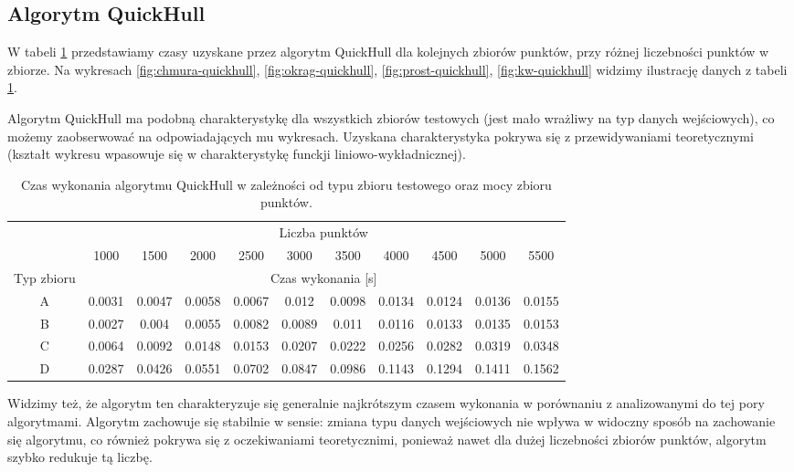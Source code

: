 \documentclass[11pt]{article}
\theoremstyle{remark} \newtheorem{definition}{def.}
\theoremstyle{definition} \newtheorem{twierdzenie}{tw.}
\begin{document}
\subsection{Algorytm QuickHull}

W tabeli \ref{tab:quickhull} przedstawiamy czasy uzyskane przez algorytm QuickHull dla kolejnych zbiorów punktów, przy różnej liczebności punktów w zbiorze. Na wykresach \ref{fig:chmura-quickhull}, 
\ref{fig:okrag-quickhull}, \ref{fig:prost-quickhull}, \ref{fig:kw-quickhull} widzimy ilustrację danych z tabeli \ref{tab:quickhull}.

Algorytm QuickHull ma podobną charakterystykę dla wszystkich zbiorów testowych (jest mało wrażliwy na typ danych wejściowych), co możemy zaobserwować na odpowiadających mu wykresach.  
Uzyskana charakterystyka pokrywa się z przewidywaniami teoretycznymi (kształt wykresu wpasowuje się w charakterystykę funckji liniowo-wykładnicznej). 

\begin{table}[]
\centering
\caption{Czas wykonania algorytmu QuickHull w zależności od typu zbioru testowego oraz mocy zbioru punktów.}
\label{tab:quickhull}
\begin{tabular}{c|c|c|c|c|c|c|c|c|c|c|}
\cline{2-11}
\multicolumn{1}{l|}{} & \multicolumn{10}{c|}{Liczba punktów} \\ \cline{2-11} 
\multicolumn{1}{l|}{} & 1000 & 1500 & 2000 & 2500 & 3000 & 3500 & 4000 & 4500 & 5000 & 5500 \\ \hline
\multicolumn{1}{|c|}{Typ zbioru} & \multicolumn{10}{c|}{Czas wykonania {[}s{]}} \\ \hline
\multicolumn{1}{|c|}{A} & 0.0031 & 0.0047 & 0.0058 & 0.0067 & 0.012 & 0.0098 & 0.0134 & 0.0124 & 0.0136 & 0.0155 \\ \hline
\multicolumn{1}{|c|}{B} & 0.0027 & 0.004 & 0.0055 & 0.0082 & 0.0089 & 0.011 & 0.0116 & 0.0133 & 0.0135 & 0.0153 \\ \hline
\multicolumn{1}{|c|}{C} & 0.0064 & 0.0092 & 0.0148 & 0.0153 & 0.0207 & 0.0222 & 0.0256 & 0.0282 & 0.0319 & 0.0348 \\ \hline
\multicolumn{1}{|c|}{D} & 0.0287 & 0.0426 & 0.0551 & 0.0702 & 0.0847 & 0.0986 & 0.1143 & 0.1294 & 0.1411 & 0.1562 \\ \hline
\end{tabular}
\end{table}

Widzimy też, że algorytm ten charakteryzuje się 
generalnie najkrótszym czasem wykonania w porównaniu z analizowanymi do tej pory algorytmami. Algorytm zachowuje się stabilnie w sensie: zmiana typu danych wejściowych nie wpływa w widoczny sposób 
na zachowanie się algorytmu, co również pokrywa się z oczekiwaniami teoretycznimi, ponieważ nawet dla dużej liczebności zbiorów punktów, algorytm szybko redukuje tą liczbę. 
\end{document}

